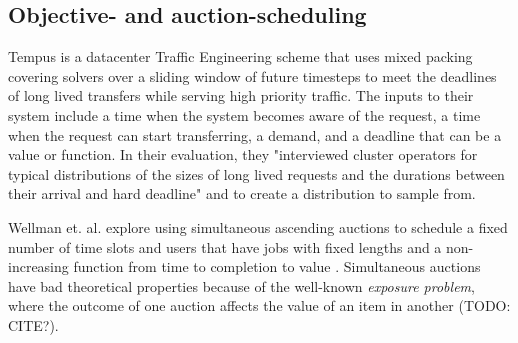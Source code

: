 \subsection{Objective- and auction-scheduling}
Tempus \cite{tempus14} is a datacenter Traffic Engineering scheme that uses mixed packing covering solvers over a sliding window of future timesteps to meet the deadlines of long lived transfers while serving high priority traffic.
The inputs to their system include a time when the system becomes aware of the request, a time when the request can start transferring, a demand, and a deadline that can be a value or function.
In their evaluation, they "interviewed cluster operators for typical
distributions of the sizes of long lived requests and the durations
between their arrival and hard deadline" and to create a distribution
to sample from.

Wellman et. al. explore using simultaneous ascending auctions to schedule a fixed number of time slots and users that have jobs with fixed lengths and a non-increasing function from time to completion to value \cite{wellman01, wellman05}.
Simultaneous auctions have bad theoretical properties because of the well-known \emph{exposure problem}, where the outcome of one auction affects the value of an item in another (TODO: CITE?).


